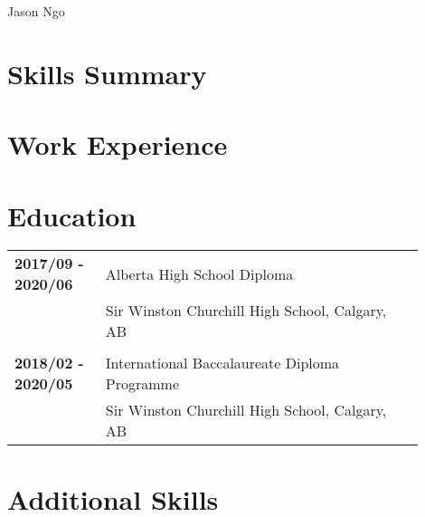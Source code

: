 \documentclass[letterpaper]{article}
\begin{document}
    \begin{center}
        \Large
        Jason Ngo

        \normalsize
        \noindent{\rule{\linewidth}{0.4pt}}
    \end{center}

    \section*{Skills Summary}
    \section*{Work Experience}
    \section*{Education}
        \begin{tabular}{p{0.2\linewidth}p{0.7\linewidth}} 
            \textbf{2017/09 - 2020/06} & Alberta High School Diploma \\
            & Sir Winston Churchill High School, Calgary, AB \\
            \\
            \textbf{2018/02 - 2020/05} & International Baccalaureate Diploma Programme \\
            & Sir Winston Churchill High School, Calgary, AB
        \end{tabular}
    \section*{Additional Skills}
\end{document}

